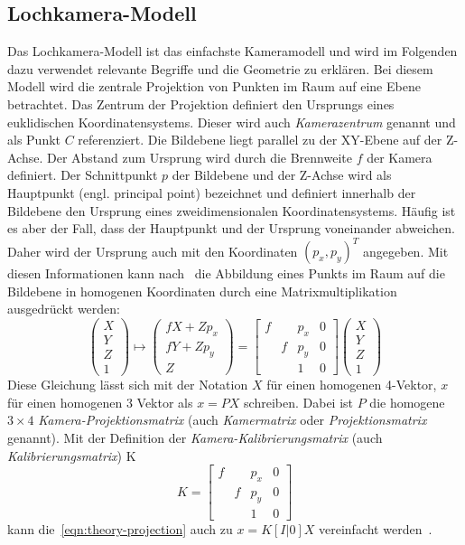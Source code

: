 \subsection{Lochkamera-Modell}\label{sec:pinhole-camera-model}
Das Lochkamera-Modell ist das einfachste Kameramodell und wird im Folgenden dazu verwendet relevante Begriffe und die Geometrie zu erklären.
Bei diesem Modell wird die zentrale Projektion von Punkten im Raum auf eine Ebene betrachtet.
Das Zentrum der Projektion definiert den Ursprungs eines euklidischen Koordinatensystems.
Dieser wird auch \emph{Kamerazentrum} genannt und als Punkt $C$ referenziert.
Die Bildebene liegt parallel zu der XY-Ebene auf der Z-Achse.
Der Abstand zum Ursprung wird durch die Brennweite $f$ der Kamera definiert.
Der Schnittpunkt $p$ der Bildebene und der Z-Achse wird als Hauptpunkt (engl. principal point) bezeichnet und definiert innerhalb der Bildebene den Ursprung eines zweidimensionalen Koordinatensystems.
Häufig ist es aber der Fall, dass der Hauptpunkt und der Ursprung voneinander abweichen.
Daher wird der Ursprung auch mit den Koordinaten $(p_x, p_y)^T$ angegeben.
Mit diesen Informationen kann nach~\cite[Gleichung 6.2]{hartley_2003} die Abbildung eines Punkts im Raum auf die Bildebene in homogenen Koordinaten durch eine Matrixmultiplikation ausgedrückt werden:
\begin{equation}
\label{eqn:theory-projection}
\begin{pmatrix}
    X \\ Y \\ Z \\ 1
\end{pmatrix}
\mapsto
\begin{pmatrix}
    fX+Zp_x \\ fY+Zp_y \\ Z
\end{pmatrix}
=
\begin{bmatrix}
    f &   & p_x & 0 \\
      & f & p_y & 0 \\
      &   & 1   & 0
\end{bmatrix}
\begin{pmatrix}
    X \\ Y \\ Z \\ 1
\end{pmatrix}
\end{equation}
Diese Gleichung lässt sich mit der Notation $X$ für einen homogenen 4-Vektor, $x$ für einen homogenen 3 Vektor als $x = PX$ schreiben.
Dabei ist $P$ die homogene $3\times 4$ \emph{Kamera-Projektionsmatrix} (auch \emph{Kamermatrix} oder \emph{Projektionsmatrix} genannt).
Mit der Definition der \emph{Kamera-Kalibrierungsmatrix} (auch \emph{Kalibrierungsmatrix}) K
\[
    K=
    \begin{bmatrix}
    f &   & p_x & 0 \\
      & f & p_y & 0 \\
      &   & 1   & 0
    \end{bmatrix}
\]
kann die~\autoref{eqn:theory-projection} auch zu $x=K[I | 0] X$ vereinfacht werden~\cite[vgl. Gleichung 6.5]{hartley_2003}. 


